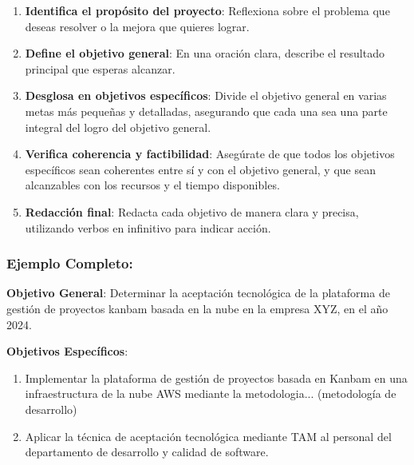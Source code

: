 \begin{enumerate}
    \item \textbf{Identifica el propósito del proyecto}: Reflexiona sobre el problema que deseas resolver o la mejora que quieres lograr.
    \item \textbf{Define el objetivo general}: En una oración clara, describe el resultado principal que esperas alcanzar.
    \item \textbf{Desglosa en objetivos específicos}: Divide el objetivo general en varias metas más pequeñas y detalladas, asegurando que cada una sea una parte integral del logro del objetivo general.
    \item \textbf{Verifica coherencia y factibilidad}: Asegúrate de que todos los objetivos específicos sean coherentes entre sí y con el objetivo general, y que sean alcanzables con los recursos y el tiempo disponibles.
    \item \textbf{Redacción final}: Redacta cada objetivo de manera clara y precisa, utilizando verbos en infinitivo para indicar acción.
\end{enumerate}

\subsubsection{Ejemplo Completo:}




\textbf{Objetivo General}:
Determinar  la  aceptación tecnológica de la  plataforma de gestión de proyectos kanbam  basada en la nube en la empresa XYZ, en el año 2024.


\textbf{Objetivos Específicos}:

\begin{enumerate}
    \item \label{[OE1]} Implementar la plataforma de gestión de proyectos basada en Kanbam en una infraestructura de la nube AWS mediante la metodologia... (metodología de desarrollo)
    \item \label{[OE2]} Aplicar la técnica de aceptación tecnológica mediante TAM al personal del departamento de desarrollo y calidad de software.
\end{enumerate}